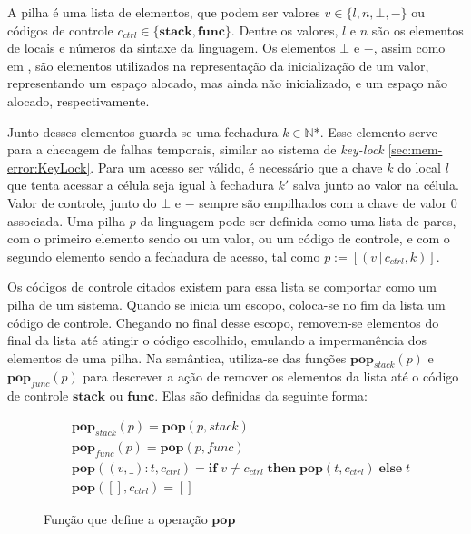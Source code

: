 A pilha é uma lista de elementos, que podem ser valores $v \in \{l, n, \bot, -\}$ ou códigos de controle $c_{ctrl} \in \{\mathbf{stack},\mathbf{func}\}$. Dentre os valores, $l$ e $n$ são os elementos de locais e números da sintaxe da linguagem. Os elementos $\bot$ e $-$, assim como em \citet{WESSEL2019}, são elementos utilizados na representação da inicialização de um valor, representando um espaço alocado, mas ainda não inicializado, e um espaço não alocado, respectivamente. 

Junto desses elementos guarda-se uma fechadura $k \in \mathbb{N}\text{*}$. Esse elemento serve para a checagem de falhas temporais, similar ao sistema de \emph{key-lock} \ref{sec:mem-error:KeyLock}. Para um acesso ser válido, é necessário que a chave $k$ do local $l$ que tenta acessar a célula seja igual à fechadura $k'$ salva junto ao valor na célula. Valor de controle, junto do $\bot$ e $-$ sempre são empilhados com a chave de valor 0 associada. Uma pilha $p$ da linguagem pode ser definida como uma lista de pares, com o primeiro elemento sendo ou um valor, ou um código de controle, e com o segundo elemento sendo a fechadura de acesso, tal como $p := [(v\,|\,c_{ctrl}, k)]$.

Os códigos de controle citados existem para essa lista se comportar como um pilha de um sistema. Quando se inicia um escopo, coloca-se no fim da lista um código de controle. Chegando no final desse escopo, removem-se elementos do final da lista até atingir o código escolhido, emulando a impermanência dos elementos de uma pilha. Na semântica, utiliza-se das funções $\mathbf{pop}_{stack}(p)$ e $\mathbf{pop}_{func}(p)$ para descrever a ação de remover os elementos da lista até o código de controle $\mathbf{stack}$ ou $\mathbf{func}$. Elas são definidas da seguinte forma:

\begin{figure}[ht]
	\begin{align}
		&\mathbf{pop}_{stack}(p) = \mathbf{pop}(p, stack) \label{fig:def:pop1}\\
		&\mathbf{pop}_{func}(p) = \mathbf{pop}(p, func) \label{fig:def:pop2}\\
		&\mathbf{pop}((v, \_) : t, c_{ctrl}) = \mathbf{if} \; v \neq c_{ctrl} \;\mathbf{then} \; \mathbf{pop}(t, c_{ctrl}) \; \mathbf{else} \; t  \label{fig:def:pop3}\\
		&\mathbf{pop}([], c_{ctrl}) =  [] \label{fig:def:pop4}
	\end{align}
	\caption{Função que define a operação $\mathbf{pop}$}
	\label{fig:def:pop}
\end{figure}

